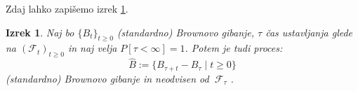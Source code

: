 \documentclass[11pt]{article}
\theoremstyle{definition}
\theoremstyle{plain}
\newtheorem{izrek}{Izrek}
\newcommand{\f}{\mathcal{F}}
\begin{document}
    Zdaj lahko zapišemo izrek \ref{thm:stopped_brownian}. %
    
    \begin{izrek}
        \label{thm:stopped_brownian}
        Naj bo \(\{B_t\}_{t \geq 0}\) (standardno) Brownovo gibanje, \(\tau\) čas ustavljanja glede na
        \((\f_t)_{t\geq 0}\) in naj velja \(P\left[\tau < \infty\right]=1\).
        Potem je tudi proces:
        \[
            \hat{B} := \{B_{\tau+t} - B_\tau \mid t \geq 0\}
            \]
            (standardno) Brownovo gibanje in neodvisen od \(\ \f_\tau\) .
    \end{izrek}



    
\end{document}
